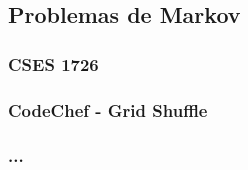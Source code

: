 \documentclass[../main.tex]{subfiles}
\begin{document}
\subsection{Problemas de Markov}
\subsubsection{CSES 1726}
\subsubsection{CodeChef - Grid Shuffle}
\subsubsection{...}
\end{document}
